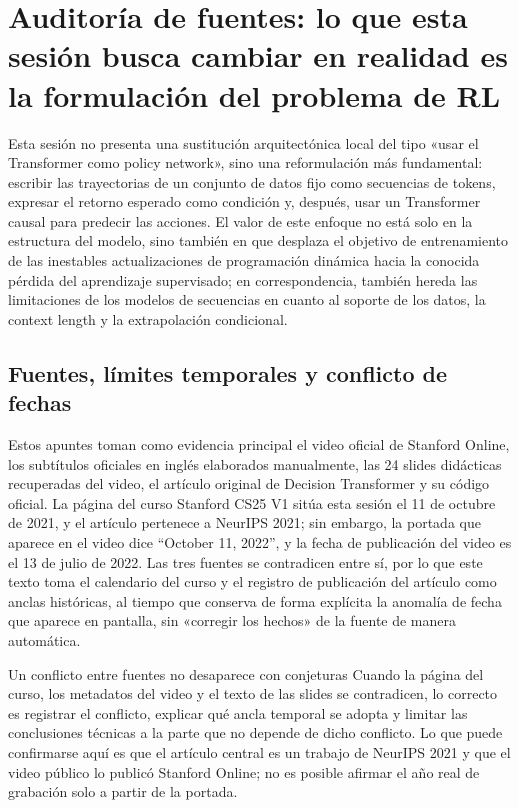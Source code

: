 \section{Auditoría de fuentes: lo que esta sesión busca cambiar en realidad es la formulación del problema de RL}

Esta sesión no presenta una sustitución arquitectónica local del tipo «usar el Transformer como policy network», sino una reformulación más fundamental: escribir las trayectorias de un conjunto de datos fijo como secuencias de tokens, expresar el retorno esperado como condición y, después, usar un Transformer causal para predecir las acciones. El valor de este enfoque no está solo en la estructura del modelo, sino también en que desplaza el objetivo de entrenamiento de las inestables actualizaciones de programación dinámica hacia la conocida pérdida del aprendizaje supervisado; en correspondencia, también hereda las limitaciones de los modelos de secuencias en cuanto al soporte de los datos, la context length y la extrapolación condicional.

\subsection{Fuentes, límites temporales y conflicto de fechas}

Estos apuntes toman como evidencia principal el video oficial de Stanford Online, los subtítulos oficiales en inglés elaborados manualmente, las 24 slides didácticas recuperadas del video, el artículo original de Decision Transformer y su código oficial. La página del curso Stanford CS25 V1 sitúa esta sesión el 11 de octubre de 2021, y el artículo pertenece a NeurIPS 2021; sin embargo, la portada que aparece en el video dice ``October 11, 2022'', y la fecha de publicación del video es el 13 de julio de 2022. Las tres fuentes se contradicen entre sí, por lo que este texto toma el calendario del curso y el registro de publicación del artículo como anclas históricas, al tiempo que conserva de forma explícita la anomalía de fecha que aparece en pantalla, sin «corregir los hechos» de la fuente de manera automática.


\begin{warningbox}{Un conflicto entre fuentes no desaparece con conjeturas}
Cuando la página del curso, los metadatos del video y el texto de las slides se contradicen, lo correcto es registrar el conflicto, explicar qué ancla temporal se adopta y limitar las conclusiones técnicas a la parte que no depende de dicho conflicto. Lo que puede confirmarse aquí es que el artículo central es un trabajo de NeurIPS 2021 y que el video público lo publicó Stanford Online; no es posible afirmar el año real de grabación solo a partir de la portada.
\end{warningbox}

